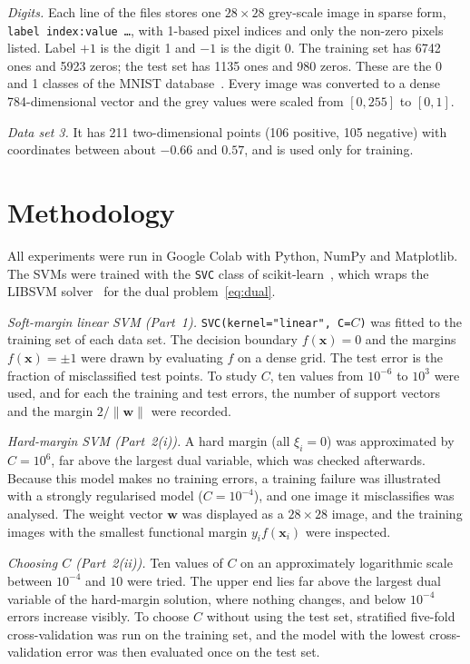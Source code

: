 \documentclass[conference,a4paper]{IEEEtran}
\begin{document}
\emph{Digits.} Each line of the files stores one $28\times28$ grey-scale image in sparse form,
\texttt{label index:value \dots}, with 1-based pixel indices and only the non-zero pixels listed. Label $+1$ is
the digit 1 and $-1$ is the digit 0. The training set has 6742 ones and 5923 zeros; the test set has 1135 ones and
980 zeros. These are the 0 and 1 classes of the MNIST database~\cite{lecun1998}. Every image was converted to a
dense 784-dimensional vector and the grey values were scaled from $[0,255]$ to $[0,1]$.

\emph{Data set 3.} It has 211 two-dimensional points (106 positive, 105 negative) with coordinates between about $-0.66$ and
$0.57$, and is used only for training.

\section{Methodology}
All experiments were run in Google Colab with Python, NumPy and Matplotlib. The SVMs were trained with the
\texttt{SVC} class of scikit-learn~\cite{pedregosa2011}, which wraps the LIBSVM solver~\cite{chang2011} for the dual
problem~\eqref{eq:dual}.

\emph{Soft-margin linear SVM (Part~1).} \texttt{SVC(kernel="linear", C=$C$)} was fitted to the training set of each
data set. The decision boundary $f(\mathbf{x})=0$ and the margins $f(\mathbf{x})=\pm1$ were drawn by evaluating
$f$ on a dense grid. The test error is the fraction of misclassified test points. To study $C$, ten values from
$10^{-6}$ to $10^{3}$ were used, and for each the training and test errors, the number of support vectors and the margin
$2/\|\mathbf{w}\|$ were recorded.

\emph{Hard-margin SVM (Part~2(i)).} A hard margin (all $\xi_i=0$) was approximated by $C=10^{6}$, far above the
largest dual variable, which was checked afterwards. Because this model makes no training errors, a training failure
was illustrated with a strongly regularised model ($C=10^{-4}$), and one image it misclassifies was analysed.
The weight vector $\mathbf{w}$ was displayed as a $28\times28$ image, and the training images with the smallest
functional margin $y_i f(\mathbf{x}_i)$ were inspected.

\emph{Choosing $C$ (Part~2(ii)).} Ten values of $C$ on an approximately logarithmic scale between $10^{-4}$ and $10$ were
tried. The upper end lies far above the largest dual variable of the hard-margin solution, where nothing changes, and
below $10^{-4}$ errors increase visibly. To choose $C$ without using the test set, stratified five-fold cross-validation
was run on the training set, and the model with the lowest cross-validation error was then evaluated once on the test set.
\end{document}
